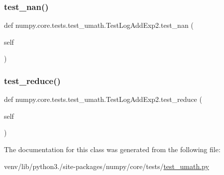 \subsubsection{\texorpdfstring{test\+\_\+nan()}{test\_nan()}}
{\footnotesize\ttfamily def numpy.\+core.\+tests.\+test\+\_\+umath.\+Test\+Log\+Add\+Exp2.\+test\+\_\+nan (\begin{DoxyParamCaption}\item[{}]{self }\end{DoxyParamCaption})}

\mbox{\label{classnumpy_1_1core_1_1tests_1_1test__umath_1_1TestLogAddExp2_a55f9a9b626d1d7c18e34670b8a41669c}} 
\subsubsection{\texorpdfstring{test\+\_\+reduce()}{test\_reduce()}}
{\footnotesize\ttfamily def numpy.\+core.\+tests.\+test\+\_\+umath.\+Test\+Log\+Add\+Exp2.\+test\+\_\+reduce (\begin{DoxyParamCaption}\item[{}]{self }\end{DoxyParamCaption})}



The documentation for this class was generated from the following file\+:\begin{DoxyCompactItemize}
\item 
venv/lib/python3./site-\/packages/numpy/core/tests/\hyperlink{test__umath_8py}{test\+\_\+umath.\+py}\end{DoxyCompactItemize}
